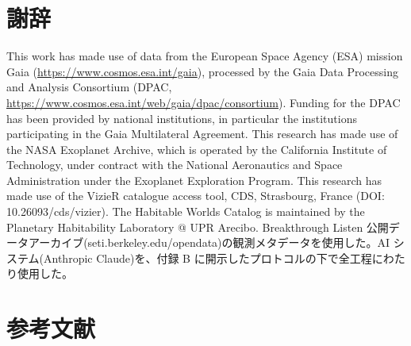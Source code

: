 \documentclass[11pt]{article}
\begin{document}
\section*{謝辞}
\noindent This work has made use of data from the European Space Agency (ESA) mission Gaia (\url{https://www.cosmos.esa.int/gaia}), processed by the Gaia Data Processing and Analysis Consortium (DPAC, \url{https://www.cosmos.esa.int/web/gaia/dpac/consortium}). Funding for the DPAC has been provided by national institutions, in particular the institutions participating in the Gaia Multilateral Agreement. This research has made use of the NASA Exoplanet Archive, which is operated by the California Institute of Technology, under contract with the National Aeronautics and Space Administration under the Exoplanet Exploration Program. This research has made use of the VizieR catalogue access tool, CDS, Strasbourg, France (DOI: 10.26093/cds/vizier). The Habitable Worlds Catalog is maintained by the Planetary Habitability Laboratory @ UPR Arecibo. Breakthrough Listen 公開データアーカイブ(seti.berkeley.edu/opendata)の観測メタデータを使用した。AI システム(Anthropic Claude)を、付録 B に開示したプロトコルの下で全工程にわたり使用した。\par\smallskip

\section*{参考文献}
\end{document}
